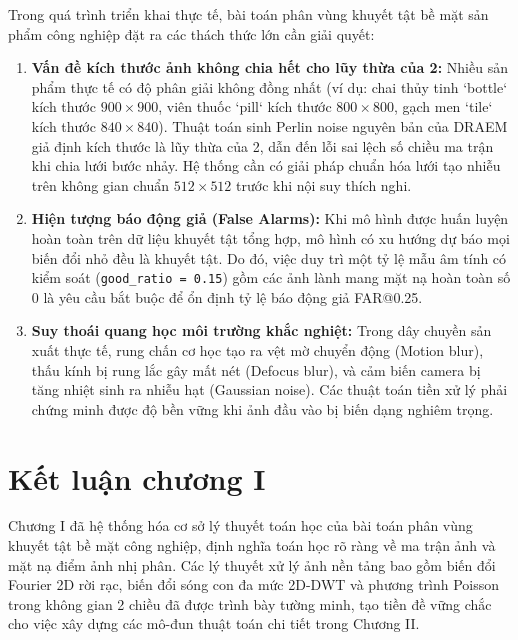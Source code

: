 Trong quá trình triển khai thực tế, bài toán phân vùng khuyết tật bề mặt sản phẩm công nghiệp đặt ra các thách thức lớn cần giải quyết:
\begin{enumerate}
    \item \textbf{Vấn đề kích thước ảnh không chia hết cho lũy thừa của 2:} Nhiều sản phẩm thực tế có độ phân giải không đồng nhất (ví dụ: chai thủy tinh `bottle` kích thước $900 \times 900$, viên thuốc `pill` kích thước $800 \times 800$, gạch men `tile` kích thước $840 \times 840$). Thuật toán sinh Perlin noise nguyên bản của DRAEM \cite{zavrtanik2021} giả định kích thước là lũy thừa của 2, dẫn đến lỗi sai lệch số chiều ma trận khi chia lưới bước nhảy. Hệ thống cần có giải pháp chuẩn hóa lưới tạo nhiễu trên không gian chuẩn $512 \times 512$ trước khi nội suy thích nghi.
    \item \textbf{Hiện tượng báo động giả (False Alarms):} Khi mô hình được huấn luyện hoàn toàn trên dữ liệu khuyết tật tổng hợp, mô hình có xu hướng dự báo mọi biến đổi nhỏ đều là khuyết tật. Do đó, việc duy trì một tỷ lệ mẫu âm tính có kiểm soát (\texttt{good\_ratio = 0.15}) gồm các ảnh lành mang mặt nạ hoàn toàn số 0 là yêu cầu bắt buộc để ổn định tỷ lệ báo động giả FAR@0.25.
    \item \textbf{Suy thoái quang học môi trường khắc nghiệt:} Trong dây chuyền sản xuất thực tế, rung chấn cơ học tạo ra vệt mờ chuyển động (Motion blur), thấu kính bị rung lắc gây mất nét (Defocus blur), và cảm biến camera bị tăng nhiệt sinh ra nhiễu hạt (Gaussian noise). Các thuật toán tiền xử lý phải chứng minh được độ bền vững khi ảnh đầu vào bị biến dạng nghiêm trọng.
\end{enumerate}

\section{Kết luận chương I}

Chương I đã hệ thống hóa cơ sở lý thuyết toán học của bài toán phân vùng khuyết tật bề mặt công nghiệp, định nghĩa toán học rõ ràng về ma trận ảnh và mặt nạ điểm ảnh nhị phân. Các lý thuyết xử lý ảnh nền tảng bao gồm biến đổi Fourier 2D rời rạc, biến đổi sóng con đa mức 2D-DWT và phương trình Poisson trong không gian 2 chiều đã được trình bày tường minh, tạo tiền đề vững chắc cho việc xây dựng các mô-đun thuật toán chi tiết trong Chương II.
